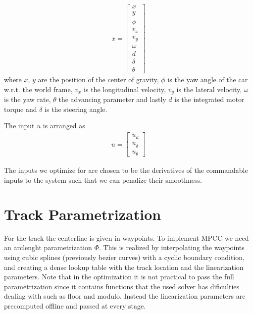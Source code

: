 \documentclass[12pt]{article}
\begin{document}
\begin{align}
x = \begin{bmatrix}
x\\
y\\
\phi\\
v_x\\
v_y\\
\omega\\
d\\
\delta\\
\theta
\end{bmatrix}
\end{align}
where $x$, $y$ are the position of the center of gravity, $\phi$ is the yaw angle of the car w.r.t. the world frame, $v_x$ is the longitudinal velocity, $v_y$ is the lateral velocity, $\omega$ is the yaw rate, $\theta$ the advancing parameter and lastly $d$ is the integrated motor torque and $\delta$ is the steering angle.

The input $u$ is arranged as
\begin{align}
u = \begin{bmatrix}
u_{\dot{d}}\\
u_{\dot{\delta}}\\
u_{\dot{ \theta}}
\end{bmatrix}
\end{align} 

The inputs we optimize for are chosen to be the derivatives of the commandable inputs to the system such that we can penalize their smoothness.

\section{Track Parametrization}

For the track the centerline is given in waypoints. To implement MPCC we need an arclenght parametrization $\Phi$. This is realized by interpolating the waypoints using cubic splines (previously bezier curves) with a cyclic boundary condition, and creating a dense lookup table with the track location and the linearization parameters. Note that in the optimization it is not practical to pass the  full parametrization since it contains functions that the used solver has dificulties dealing with such as floor and modulo. Instead the linearization parameters are precomputed offline and passed at every stage.   
\end{document}
